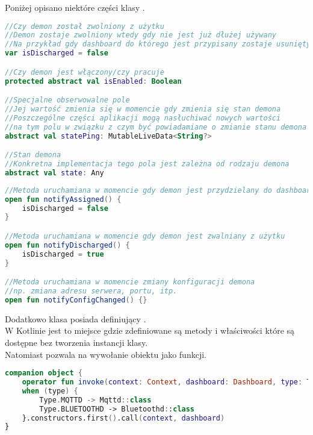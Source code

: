 Poniżej opisano niektóre części klasy .

\begin{lstlisting}[language=Kotlin]
//Czy demon został zwolniony z użytku
//Demon zostaje zwolniony wtedy gdy nie jest już dłużej używany
//Na przykład gdy dashboard do którego jest przypisany zostaje usunięty
var isDischarged = false

//Czy demon jest włączony/czy pracuje
protected abstract val isEnabled: Boolean

//Specjalne obserwowalne pole
//Jej wartość zmienia się w momencie gdy zmienia się stan demona
//Poszczególne części aplikacji mogą nasłuchiwać nowych wartości
//na tym polu w związku z czym być powiadamiane o zmianie stanu demona
abstract val statePing: MutableLiveData<String?>

//Stan demona
//Konkretna implementacja tego pola jest zależna od rodzaju demona
abstract val state: Any
\end{lstlisting}

\newpage

\begin{lstlisting}[language=Kotlin]
//Metoda uruchamiana w momencie gdy demon jest przydzielany do dashboardu
open fun notifyAssigned() {
    isDischarged = false
}

//Metoda uruchamiana w momencie gdy demon jest zwalniany z użytku
open fun notifyDischarged() {
    isDischarged = true
}

//Metoda uruchamiana w momencie zmiany konfiguracji demona
//np. zmiana adresu serwera, portu, itp.
open fun notifyConfigChanged() {}
\end{lstlisting}

\vspace{1em}

Dodatkowo klasa  posiada  definiujący .\\

W Kotlinie  jest to miejsce gdzie zdefiniowane są metody i właściwości które są dostępne bez tworzenia instancji klasy.\\
Natomiast  pozwala na wywołanie obiektu jako funkcji.\\

\begin{lstlisting}[language=Kotlin]
companion object {
    operator fun invoke(context: Context, dashboard: Dashboard, type: Type) =
    when (type) {
        Type.MQTTD -> Mqttd::class
        Type.BLUETOOTHD -> Bluetoothd::class
    }.constructors.first().call(context, dashboard)
}
\end{lstlisting}


